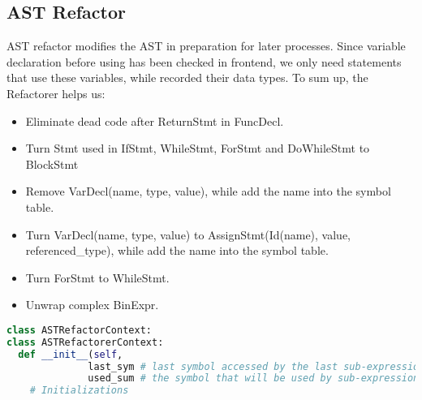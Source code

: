 \subsection{AST Refactor}

AST refactor modifies the AST in preparation for later processes. Since variable declaration before using has been checked in frontend, we only need statements that use these variables, while recorded their data types. To sum up, the Refactorer helps us:

\begin{itemize}
  \item Eliminate dead code after ReturnStmt in FuncDecl.
  \item Turn Stmt used in IfStmt, WhileStmt, ForStmt and DoWhileStmt to BlockStmt
  \item Remove VarDecl(name, type, value), while add the name into the symbol table.
  \item Turn VarDecl(name, type, value) to AssignStmt(Id(name), value, referenced\_type), while add the name into the symbol table.
  \item Turn ForStmt to WhileStmt.
  \item Unwrap complex BinExpr.
\end{itemize}

\begin{lstlisting}[language=Python]
class ASTRefactorContext:
class ASTRefactorerContext:
  def __init__(self, 
              last_sym # last symbol accessed by the last sub-expression, excluded to BinExpr unwrapper
              used_sum # the symbol that will be used by sub-expressions):
    # Initializations
\end{lstlisting}